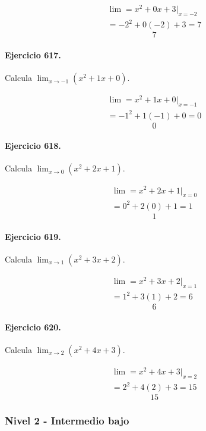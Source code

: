 \documentclass[11pt,a4paper]{article}
\begin{document}
\[
\begin{aligned}
\lim=x^2+0x+3\big|_{x=-2}\\
=-2^2+0(-2)+3=7
\end{aligned}
\]
\[\boxed{7}\]


\paragraph{Ejercicio 617.} Calcula $\displaystyle\lim_{x\to -1}(x^2+1x+0)$.

\[
\begin{aligned}
\lim=x^2+1x+0\big|_{x=-1}\\
=-1^2+1(-1)+0=0
\end{aligned}
\]
\[\boxed{0}\]


\paragraph{Ejercicio 618.} Calcula $\displaystyle\lim_{x\to 0}(x^2+2x+1)$.

\[
\begin{aligned}
\lim=x^2+2x+1\big|_{x=0}\\
=0^2+2(0)+1=1
\end{aligned}
\]
\[\boxed{1}\]


\paragraph{Ejercicio 619.} Calcula $\displaystyle\lim_{x\to 1}(x^2+3x+2)$.

\[
\begin{aligned}
\lim=x^2+3x+2\big|_{x=1}\\
=1^2+3(1)+2=6
\end{aligned}
\]
\[\boxed{6}\]


\paragraph{Ejercicio 620.} Calcula $\displaystyle\lim_{x\to 2}(x^2+4x+3)$.

\[
\begin{aligned}
\lim=x^2+4x+3\big|_{x=2}\\
=2^2+4(2)+3=15
\end{aligned}
\]
\[\boxed{15}\]


\newpage

\subsubsection*{Nivel 2 - Intermedio bajo}
\end{document}
